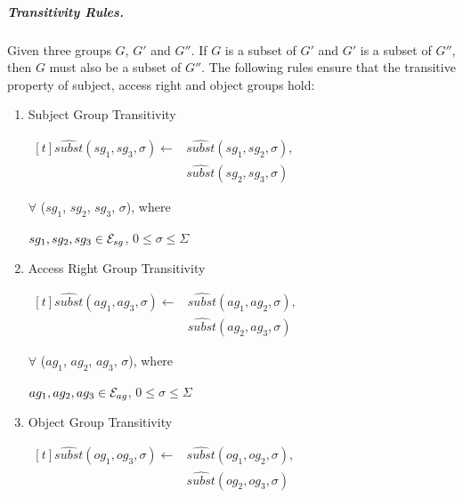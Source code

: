 \documentclass[10pt, twocolumn]{article}
\begin{document}
          \subparagraph{Transitivity Rules.}

            Given three groups $G$, $G'$ and $G''$. If $G$ is a subset of $G'$
            and $G'$ is a subset of $G''$, then $G$ must also be a subset of
            $G''$. The following rules ensure that the transitive property of
            subject, access right and object groups hold:

            \begin{enumerate}
              \item
                Subject Group Transitivity

                \begin{math}
                  \begin{aligned}[t]
                    \hat{subst}(sg_{1}, sg_{3}, \sigma) \leftarrow &
                    \hat{subst}(sg_{1}, sg_{2}, \sigma), \\
                    & \hat{subst}(sg_{2}, sg_{3}, \sigma)
                  \end{aligned}
                \end{math}

                $\forall$ ($sg_{1}$, $sg_{2}$, $sg_{3}$, $\sigma$), where

                $sg_{1}, sg_{2}, sg_{3} \in {\cal E}_{sg}$,
                $0 \leq \sigma \leq \Sigma$

              \item
                Access Right Group Transitivity

                \begin{math}
                  \begin{aligned}[t]
                    \hat{subst}(ag_{1}, ag_{3}, \sigma) \leftarrow &
                    \hat{subst}(ag_{1}, ag_{2}, \sigma), \\
                    & \hat{subst}(ag_{2}, ag_{3}, \sigma)
                  \end{aligned}
                \end{math}

                $\forall$ ($ag_{1}$, $ag_{2}$, $ag_{3}$, $\sigma$), where

                $ag_{1}, ag_{2}, ag_{3} \in {\cal E}_{ag}$,
                $0 \leq \sigma \leq \Sigma$

              \item
                Object Group Transitivity

                \begin{math}
                  \begin{aligned}[t]
                    \hat{subst}(og_{1}, og_{3}, \sigma) \leftarrow &
                    \hat{subst}(og_{1}, og_{2}, \sigma), \\
                    & \hat{subst}(og_{2}, og_{3}, \sigma)
                  \end{aligned}
                \end{math}


\end{enumerate}
\end{document}
